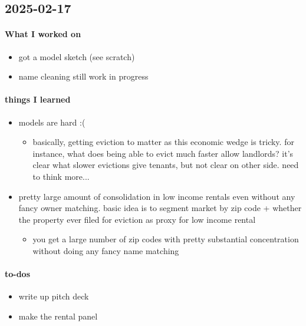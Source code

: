 \subsection{2025-02-17}

\paragraph{What I worked on}
\begin{itemize}
    \item got a model sketch (see scratch)
    \item name cleaning still work in progress
\end{itemize}

\paragraph{things I learned}
\begin{itemize}
    \item models are hard :(
    \begin{itemize}
        \item basically, getting eviction to matter as this economic wedge is tricky. for instance, what does being able to evict much faster allow landlords? it's clear what slower evictions give tenants, but not clear on other side. need to think more...
    \end{itemize}
    \item pretty large amount of consolidation in low income rentals even without any fancy owner matching. basic idea is to segment market by zip code + whether the property ever filed for eviction as proxy for low income rental
    \begin{itemize}
        \item you get a large number of zip codes with pretty substantial concentration without doing any fancy name matching
    \end{itemize}
\end{itemize}

\paragraph{to-dos}
\begin{itemize}
    \item write up pitch deck
    \item make the rental panel
\end{itemize}